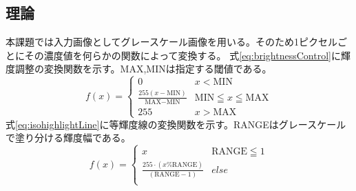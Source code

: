 \documentclass[11pt,a4paper,titlepage,dvipdfmx]{jarticle}
\begin{document}
    \subsection{理論}
      本課題では入力画像としてグレースケール画像を用いる。そのため1ピクセルごとにその濃度値を何らかの関数によって変換する。
      式\eqref{eq:brightnessControl}に輝度調整の変換関数を示す。MAX,MINは指定する閾値である。
      \begin{equation} \label{eq:brightnessControl}
        f(x) = 
        \begin{cases}
        0   &   x < \text{MIN}  \\
        \frac{255(x - \text{MIN})}{\text{MAX} - \text{MIN}} & \text{MIN} \leqq x \leqq \text{MAX} \\
        255        &  x > \text{MAX} 
        \end{cases}
      \end{equation}
      式\eqref{eq:isohighlightLine}に等輝度線の変換関数を示す。RANGEはグレースケールで塗り分ける輝度幅である。
      \begin{equation} \label{eq:isohighlightLine}
        f(x) = 
        \begin{cases}
        x   &   \text{RANGE} \leqq 1  \\
        \frac{255 \cdot(x \% \text{RANGE})}{(\text{RANGE} - 1)} & else \\
        \end{cases}
      \end{equation}
\end{document}
